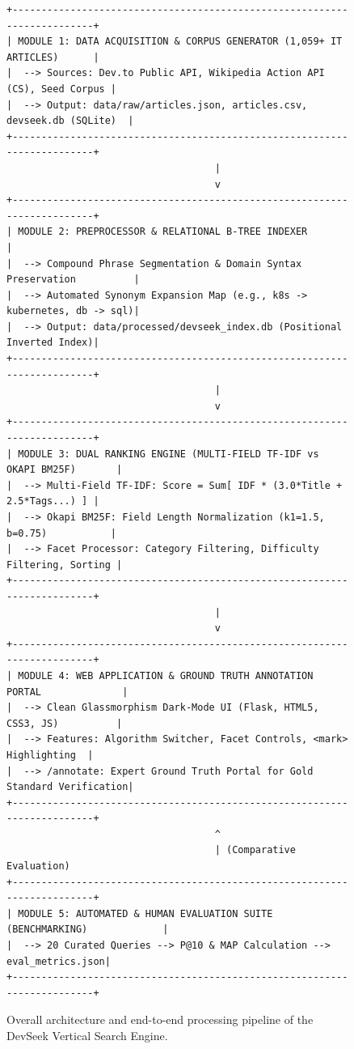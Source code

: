 \documentclass[12pt,a4paper]{article}
\begin{document}
\begin{figure}[H]
\centering
\begin{tcolorbox}[colback=backcolour,colframe=primaryblue,title=\textbf{DevSeek 5-Module Processing Pipeline Architecture}]
\footnotesize
\begin{verbatim}
+-------------------------------------------------------------------------+
| MODULE 1: DATA ACQUISITION & CORPUS GENERATOR (1,059+ IT ARTICLES)      |
|  --> Sources: Dev.to Public API, Wikipedia Action API (CS), Seed Corpus |
|  --> Output: data/raw/articles.json, articles.csv, devseek.db (SQLite)  |
+-------------------------------------------------------------------------+
                                    |
                                    v
+-------------------------------------------------------------------------+
| MODULE 2: PREPROCESSOR & RELATIONAL B-TREE INDEXER                      |
|  --> Compound Phrase Segmentation & Domain Syntax Preservation          |
|  --> Automated Synonym Expansion Map (e.g., k8s -> kubernetes, db -> sql)|
|  --> Output: data/processed/devseek_index.db (Positional Inverted Index)|
+-------------------------------------------------------------------------+
                                    |
                                    v
+-------------------------------------------------------------------------+
| MODULE 3: DUAL RANKING ENGINE (MULTI-FIELD TF-IDF vs OKAPI BM25F)       |
|  --> Multi-Field TF-IDF: Score = Sum[ IDF * (3.0*Title + 2.5*Tags...) ] |
|  --> Okapi BM25F: Field Length Normalization (k1=1.5, b=0.75)           |
|  --> Facet Processor: Category Filtering, Difficulty Filtering, Sorting |
+-------------------------------------------------------------------------+
                                    |
                                    v
+-------------------------------------------------------------------------+
| MODULE 4: WEB APPLICATION & GROUND TRUTH ANNOTATION PORTAL              |
|  --> Clean Glassmorphism Dark-Mode UI (Flask, HTML5, CSS3, JS)          |
|  --> Features: Algorithm Switcher, Facet Controls, <mark> Highlighting  |
|  --> /annotate: Expert Ground Truth Portal for Gold Standard Verification|
+-------------------------------------------------------------------------+
                                    ^
                                    | (Comparative Evaluation)
+-------------------------------------------------------------------------+
| MODULE 5: AUTOMATED & HUMAN EVALUATION SUITE (BENCHMARKING)             |
|  --> 20 Curated Queries --> P@10 & MAP Calculation --> eval_metrics.json|
+-------------------------------------------------------------------------+
\end{verbatim}
\end{tcolorbox}
\caption{Overall architecture and end-to-end processing pipeline of the DevSeek Vertical Search Engine.}
\end{figure}
\end{document}
